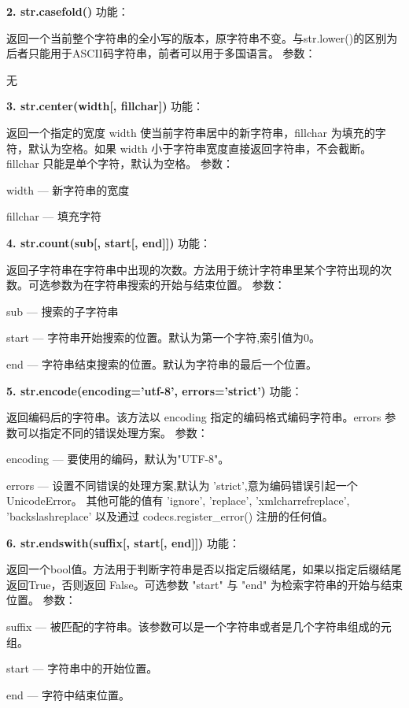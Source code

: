 \documentclass{book}
\begin{document}
\begin{CJK}{UTF8}{gbsn}
\noindent \textbf{2. str.casefold()} \newline
功能：\par 返回一个当前整个字符串的全小写的版本，原字符串不变。与str.lower()的区别为后者只能用于ASCII码字符串，前者可以用于多国语言。\newline
参数：\par 无
\newline

\noindent \textbf{3. str.center(width[, fillchar])} \newline
功能：\par 返回一个指定的宽度 width 使当前字符串居中的新字符串，fillchar 为填充的字符，默认为空格。如果 width 小于字符串宽度直接返回字符串，不会截断。fillchar 只能是单个字符，默认为空格。\newline
参数：\par width --- 新字符串的宽度
     \par fillchar --- 填充字符
\newline

\noindent \textbf{4. str.count(sub[, start[, end]])} \newline
功能：\par 返回子字符串在字符串中出现的次数。方法用于统计字符串里某个字符出现的次数。可选参数为在字符串搜索的开始与结束位置。\newline
参数：\par sub --- 搜索的子字符串
  	 \par start --- 字符串开始搜索的位置。默认为第一个字符,索引值为0。
  	 \par end --- 字符串结束搜索的位置。默认为字符串的最后一个位置。
\newline

\newpage       
\noindent \textbf{5. str.encode(encoding='utf-8', errors='strict')} \newline
功能：\par 返回编码后的字符串。该方法以 encoding 指定的编码格式编码字符串。errors
参数可以指定不同的错误处理方案。\newline
参数：\par encoding --- 要使用的编码，默认为"UTF-8"。
     \par errors --- 设置不同错误的处理方案,默认为 'strict',意为编码错误引起一个UnicodeError。 其他可能的值有 'ignore', 'replace', 'xmlcharrefreplace', 'backslashreplace' 以及通过 codecs.register\_error() 注册的任何值。
\newline
 
\noindent \textbf{6. str.endswith(suffix[, start[, end]])} \newline
功能：\par 返回一个bool值。方法用于判断字符串是否以指定后缀结尾，如果以指定后缀结尾返回True，否则返回 False。可选参数 "start" 与 "end" 为检索字符串的开始与结束位置。
\newline
参数：\par suffix --- 被匹配的字符串。该参数可以是一个字符串或者是几个字符串组成的元组。
     \par start --- 字符串中的开始位置。
     \par end --- 字符中结束位置。     
\newline


\end{CJK}
\end{document}
